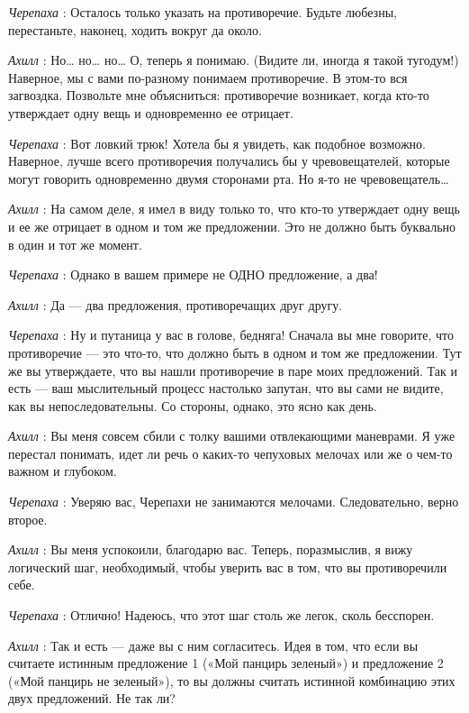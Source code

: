 \emph{Черепаха} : Осталось только указать на противоречие. Будьте любезны, перестаньте, наконец, ходить вокруг да около.

\emph{Ахилл} : Но\ldots{} но\ldots{} но\ldots{} О, теперь я понимаю. (Видите ли, иногда я такой тугодум!) Наверное, мы с вами по-разному понимаем противоречие. В этом-то вся загвоздка. Позвольте мне объясниться: противоречие возникает, когда кто-то утверждает одну вещь и одновременно ее отрицает.

\emph{Черепаха} : Вот ловкий трюк! Хотела бы я увидеть, как подобное возможно. Наверное, лучше всего противоречия получались бы у чревовещателей, которые могут говорить одновременно двумя сторонами рта. Но я-то не чревовещатель\ldots{}

\emph{Ахилл} : На самом деле, я имел в виду только то, что кто-то утверждает одну вещь и ее же отрицает в одном и том же предложении. Это не должно быть буквально в один и тот же момент.

\emph{Черепаха} : Однако в вашем примере не ОДНО предложение, а два!

\emph{Ахилл} : Да --- два предложения, противоречащих друг другу.

\emph{Черепаха} : Ну и путаница у вас в голове, бедняга! Сначала вы мне говорите, что противоречие --- это что-то, что должно быть в одном и том же предложении. Тут же вы утверждаете, что вы нашли противоречие в паре моих предложений. Так и есть --- ваш мыслительный процесс настолько запутан, что вы сами не видите, как вы непоследовательны. Со стороны, однако, это ясно как день.

\emph{Ахилл} : Вы меня совсем сбили с толку вашими отвлекающими маневрами. Я уже перестал понимать, идет ли речь о каких-то чепуховых мелочах или же о чем-то важном и глубоком.

\emph{Черепаха} : Уверяю вас, Черепахи не занимаются мелочами. Следовательно, верно второе.

\emph{Ахилл} : Вы меня успокоили, благодарю вас. Теперь, поразмыслив, я вижу логический шаг, необходимый, чтобы уверить вас в том, что вы противоречили себе.

\emph{Черепаха} : Отлично! Надеюсь, что этот шаг столь же легок, сколь бесспорен.

\emph{Ахилл} : Так и есть --- даже вы с ним согласитесь. Идея в том, что если вы считаете истинным предложение 1 («Мой панцирь зеленый») и предложение 2 («Мой панцирь не зеленый»), то вы должны считать истинной комбинацию этих двух предложений. Не так ли?

